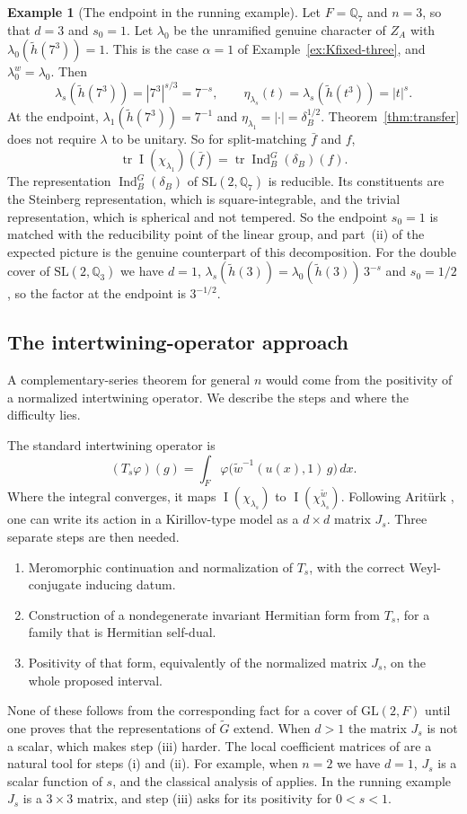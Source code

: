\documentclass[12pt,letterpaper]{article}
\numberwithin{equation}{section}
\theoremstyle{plain}
\theoremstyle{definition}
\newtheorem{example}[theorem]{Example}
\theoremstyle{remark}
\newcommand{\Gt}{\widetilde G}
\newcommand{\hl}{\tilde h}
\newcommand{\wt}{\tilde w}
\newcommand{\Qq}{\mathbb Q}
\newcommand{\ZA}{Z_A}
\DeclareMathOperator{\PI}{I}
\DeclareMathOperator{\Ind}{Ind}
\DeclareMathOperator{\tr}{tr}
\newcommand{\SL}{\mathrm{SL}}
\newcommand{\GL}{\mathrm{GL}}
\begin{document}
\begin{example}[The endpoint in the running example]\label{ex:endpoint}
Let $F=\Qq_7$ and $n=3$, so that $d=3$ and $s_0=1$. Let $\lambda_0$ be
the unramified genuine character of $\ZA$ with $\lambda_0(\hl(7^3))=1$.
This is the case $\alpha=1$ of Example~\ref{ex:Kfixed-three}, and
$\lambda_0^w=\lambda_0$. Then
\[
\lambda_s(\hl(7^3))=|7^3|^{s/3}=7^{-s},\qquad
\eta_{\lambda_s}(t)=\lambda_s(\hl(t^3))=|t|^{s}.
\]
At the endpoint, $\lambda_1(\hl(7^3))=7^{-1}$ and
$\eta_{\lambda_1}=|\cdot|=\delta_B^{1/2}$. Theorem~\ref{thm:transfer}
does not require $\lambda$ to be unitary. So for split-matching
$\bar f$ and $f$,
\[
\tr\PI(\chi_{\lambda_1})(\bar f)=\tr\Ind_B^G(\delta_B)(f).
\]
The representation $\Ind_B^G(\delta_B)$ of $\SL(2,\Qq_7)$ is reducible.
Its constituents are the Steinberg representation, which is
square-integrable, and the trivial representation, which is spherical
and not tempered. So the endpoint $s_0=1$ is matched with the
reducibility point of the linear group, and part~(ii) of the expected
picture is the genuine counterpart of this decomposition. For the
double cover of $\SL(2,\Qq_3)$ we have $d=1$,
$\lambda_s(\hl(3))=\lambda_0(\hl(3))\,3^{-s}$ and $s_0=1/2$, so the
factor at the endpoint is $3^{-1/2}$.
\end{example}

\subsection{The intertwining-operator approach}\label{subsec:intertwining}

A complementary-series theorem for general $n$ would come from the
positivity of a normalized intertwining operator. We describe the steps
and where the difficulty lies.

The standard intertwining operator is
\[
(T_s\varphi)(g)=\int_F\varphi\bigl(\wt^{-1}(u(x),1)\,g\bigr)\,dx .
\]
Where the integral converges, it maps $\PI(\chi_{\lambda_s})$ to
$\PI(\chi_{\lambda_s}^{\wt})$. Following Arit\"urk \cite{Ar80}, one can
write its action in a Kirillov-type model as a $d\times d$ matrix $J_s$.
Three separate steps are then needed.
\begin{enumerate}[label=(\roman*),leftmargin=*]
\item Meromorphic continuation and normalization of $T_s$, with the
  correct Weyl-conjugate inducing datum.
\item Construction of a nondegenerate invariant Hermitian form from
  $T_s$, for a family that is Hermitian self-dual.
\item Positivity of that form, equivalently of the normalized matrix
  $J_s$, on the whole proposed interval.
\end{enumerate}
None of these follows from the corresponding fact for a cover of
$\GL(2,F)$ until one proves that the representations of $\Gt$ extend.
When $d>1$ the matrix $J_s$ is not a scalar, which makes step (iii)
harder. The local coefficient matrices of \cite{GS16,Sz19} are a
natural tool for steps (i) and (ii). For example, when $n=2$ we have
$d=1$, $J_s$ is a scalar function of $s$, and the classical analysis
of \cite{GS75} applies. In the running example $J_s$ is a $3\times3$
matrix, and step (iii) asks for its positivity for $0<s<1$.
\end{document}
